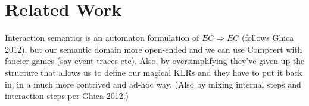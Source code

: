 \documentclass[acmsmall,anonymous,review]{acmart}
\begin{document}

\section{Related Work} %

Interaction semantics is an automaton formulation of $EC \Rightarrow EC$
(follows Ghica 2012),
but our semantic domain more open-ended and
we can use Compcert with fancier games
(say event traces etc).
Also,
by oversimplifying they've given up the structure
that allows us to define our magical KLRs
and they have to put it back in,
in a much more contrived and ad-hoc way.
(Also by mixing internal steps and interaction steps per Ghica 2012.)



\end{document}
